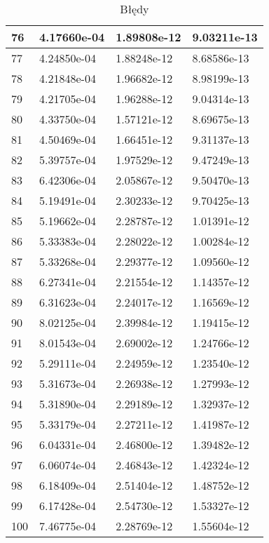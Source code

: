 \documentclass{article}
\begin{document}
\begin{table}[H]
{\begin{tabular}{|l|l|l|l|}
76 & 4.17660e-04 & 1.89808e-12 & 9.03211e-13 \\ \hline
77 & 4.24850e-04 & 1.88248e-12 & 8.68586e-13 \\ \hline
78 & 4.21848e-04 & 1.96682e-12 & 8.98199e-13 \\ \hline
79 & 4.21705e-04 & 1.96288e-12 & 9.04314e-13 \\ \hline
80 & 4.33750e-04 & 1.57121e-12 & 8.69675e-13 \\ \hline
81 & 4.50469e-04 & 1.66451e-12 & 9.31137e-13 \\ \hline
82 & 5.39757e-04 & 1.97529e-12 & 9.47249e-13 \\ \hline
83 & 6.42306e-04 & 2.05867e-12 & 9.50470e-13 \\ \hline
84 & 5.19491e-04 & 2.30233e-12 & 9.70425e-13 \\ \hline
85 & 5.19662e-04 & 2.28787e-12 & 1.01391e-12 \\ \hline
86 & 5.33383e-04 & 2.28022e-12 & 1.00284e-12 \\ \hline
87 & 5.33268e-04 & 2.29377e-12 & 1.09560e-12 \\ \hline
88 & 6.27341e-04 & 2.21554e-12 & 1.14357e-12 \\ \hline
89 & 6.31623e-04 & 2.24017e-12 & 1.16569e-12 \\ \hline
90 & 8.02125e-04 & 2.39984e-12 & 1.19415e-12 \\ \hline
91 & 8.01543e-04 & 2.69002e-12 & 1.24766e-12 \\ \hline
92 & 5.29111e-04 & 2.24959e-12 & 1.23540e-12 \\ \hline
93 & 5.31673e-04 & 2.26938e-12 & 1.27993e-12 \\ \hline
94 & 5.31890e-04 & 2.29189e-12 & 1.32937e-12 \\ \hline
95 & 5.33179e-04 & 2.27211e-12 & 1.41987e-12 \\ \hline
96 & 6.04331e-04 & 2.46800e-12 & 1.39482e-12 \\ \hline
97 & 6.06074e-04 & 2.46843e-12 & 1.42324e-12 \\ \hline
98 & 6.18409e-04 & 2.51404e-12 & 1.48752e-12 \\ \hline
99 & 6.17428e-04 & 2.54730e-12 & 1.53327e-12 \\ \hline
100 & 7.46775e-04 & 2.28769e-12 & 1.55604e-12 \\ \hline
\end{tabular}
\hspace*{-2.5cm}
}
\caption{Błędy}
\end{table}
\end{document}
